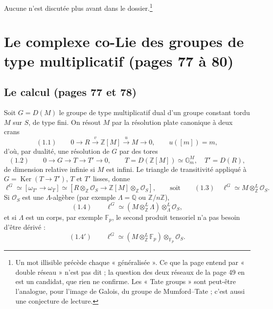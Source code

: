 \documentclass[11pt,a4paper]{article}
\begin{document}
Aucune n'est discutée plus avant dans le dossier.\footnote{Un mot illisible précède chaque « généralisée ». Ce que la page
entend par « double réseau » n'est pas dit ; la question des deux réseaux de
la page 49 en est un candidat, que rien ne confirme. Les « Tate groups » sont
peut-être l'analogue, pour l'image de Galois, du groupe de Mumford--Tate ;
c'est aussi une conjecture de lecture.}

\section*{Le complexe co-Lie des groupes de type multiplicatif (pages 77 à 80)}

\subsection*{Le calcul (pages 77 et 78)}

Soit $G = D(M)$ le groupe de type multiplicatif dual d'un groupe constant
tordu $M$ sur $S$, de type fini. On résout $M$ par la résolution plate
canonique à deux crans
\[
(1.1) \qquad 0 \to R \xrightarrow{\ v\ } \mathbb{Z}[M] \xrightarrow{\ u\ } M
\to 0, \qquad u([m]) = m,
\]
d'où, par dualité, une résolution de $G$ par des tores
\[
(1.2) \qquad 0 \to G \to T \to T' \to 0, \qquad T = D(\mathbb{Z}[M]) \simeq
\mathbb{G}_{m}^{M}, \quad T' = D(R),
\]
de dimension relative infinie si $M$ est infini. Le triangle de
transitivité appliqué à $G = \operatorname{Ker}(T \to T')$, $T$ et $T'$ lisses,
donne
\[
\ell^{G} \simeq [\omega_{T'} \to \omega_{T}] \simeq [R \otimes_{\mathbb{Z}}
\mathcal{O}_{S} \to \mathbb{Z}[M] \otimes_{\mathbb{Z}} \mathcal{O}_{S}],
\qquad\text{soit}\qquad
(1.3) \quad \ell^{G} \simeq M \otimes^{L}_{\mathbb{Z}} \mathcal{O}_{S} .
\]
Si $\mathcal{O}_{S}$ est une $\Lambda$-algèbre (par exemple $\Lambda =
\mathbb{Q}$ ou $\mathbb{Z}/n\mathbb{Z}$),
\[
(1.4) \qquad \ell^{G} \simeq (M \otimes^{L}_{\mathbb{Z}} \Lambda)
\otimes^{L}_{\Lambda} \mathcal{O}_{S},
\]
et si $\Lambda$ est un corps, par exemple $\mathbb{F}_{p}$, le second produit
tensoriel n'a pas besoin d'être dérivé :
\[
(1.4') \qquad \ell^{G} \simeq (M \otimes^{L}_{\mathbb{Z}} \mathbb{F}_{p})
\otimes_{\mathbb{F}_{p}} \mathcal{O}_{S} .
\]
\end{document}
